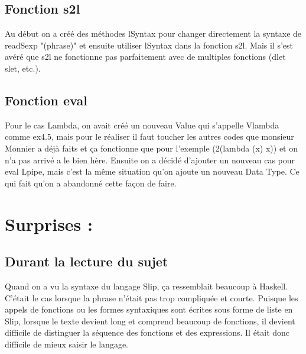 \documentclass{article}
\begin{document}
\subsection{Fonction s2l}


Au début on a créé des méthodes lSyntax pour changer directement la syntaxe de readSexp "(phrase)" et ensuite utiliser lSyntax dans la fonction s2l. Mais il s’est avéré que s2l ne fonctionne pas parfaitement avec de multiples fonctions (dlet slet, etc.).

\subsection{Fonction eval}


Pour le cas Lambda, on avait créé un nouveau Value qui s'appelle Vlambda comme ex4.5, mais pour le réaliser il faut toucher les autres codes que monsieur Monnier a déjà faits et ça fonctionne que pour l'exemple (2(lambda (x) x)) et on n'a pas arrivé a le bien hère. Ensuite on a décidé d’ajouter un nouveau cas pour eval Lpipe, mais c'est la même situation qu'on ajoute un nouveau Data Type. Ce qui fait qu'on a abandonné cette façon de faire.

%
%
%

\vspace{1.2cm}


\section{Surprises :}
\vspace{0.5cm}

\subsection{Durant la lecture du sujet}
Quand on a vu la syntaxe du langage Slip, ça ressemblait beaucoup à Haskell. C'était le cas lorsque la phrase n'était pas trop compliquée et courte. Puisque les appels de fonctions ou les formes syntaxiques sont écrites sous forme de liste en Slip, lorsque le texte devient long et comprend beaucoup de fonctions, il devient difficile de distinguer la séquence des fonctions et des expressions. Il était donc difficile de mieux saisir le langage.
\end{document}
